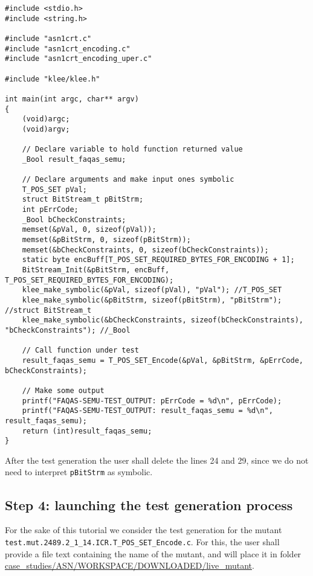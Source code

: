 \begin{lstlisting}[style=CStyle]
#include <stdio.h>
#include <string.h>

#include "asn1crt.c"
#include "asn1crt_encoding.c"
#include "asn1crt_encoding_uper.c"

#include "klee/klee.h"

int main(int argc, char** argv)
{
    (void)argc;
    (void)argv;

    // Declare variable to hold function returned value
    _Bool result_faqas_semu;

    // Declare arguments and make input ones symbolic
    T_POS_SET pVal;
    struct BitStream_t pBitStrm;
    int pErrCode;
    _Bool bCheckConstraints;
    memset(&pVal, 0, sizeof(pVal));
    memset(&pBitStrm, 0, sizeof(pBitStrm));
    memset(&bCheckConstraints, 0, sizeof(bCheckConstraints));
    static byte encBuff[T_POS_SET_REQUIRED_BYTES_FOR_ENCODING + 1];
    BitStream_Init(&pBitStrm, encBuff, T_POS_SET_REQUIRED_BYTES_FOR_ENCODING);
    klee_make_symbolic(&pVal, sizeof(pVal), "pVal"); //T_POS_SET
    klee_make_symbolic(&pBitStrm, sizeof(pBitStrm), "pBitStrm"); //struct BitStream_t
    klee_make_symbolic(&bCheckConstraints, sizeof(bCheckConstraints), "bCheckConstraints"); //_Bool

    // Call function under test
    result_faqas_semu = T_POS_SET_Encode(&pVal, &pBitStrm, &pErrCode, bCheckConstraints);

    // Make some output
    printf("FAQAS-SEMU-TEST_OUTPUT: pErrCode = %d\n", pErrCode);
    printf("FAQAS-SEMU-TEST_OUTPUT: result_faqas_semu = %d\n", result_faqas_semu);
    return (int)result_faqas_semu;
}
\end{lstlisting}

After the test generation the user shall delete the lines 24 and 29, since we do not need \SEMUS to interpret \texttt{pBitStrm} as symbolic.

\subsection{Step 4: launching the test generation process}

For the sake of this tutorial we consider the test generation for the mutant \\
\texttt{test.mut.2489.2\_1\_14.ICR.T\_POS\_SET\_Encode.c}. For this, the user shall provide a file text containing the name of the mutant, and will place it in folder \url{case\_studies/ASN/WORKSPACE/DOWNLOADED/live\_mutant}.

